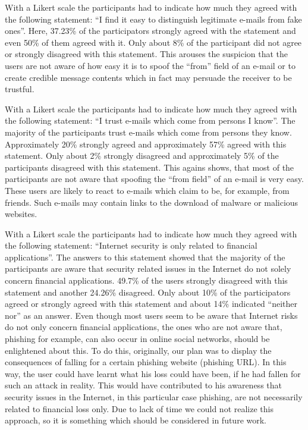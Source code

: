 \begin{description}[leftmargin=0cm]
	\item[Self-Assessment - Distinguish legitimate from illegitimate e-mails] With a Likert scale the participants had to indicate how much they agreed with the following statement: ``I find it easy to distinguish legitimate e-mails from fake ones''. Here, 37.23\% of the participators strongly agreed with the statement and even 50\% of them agreed with it. Only about 8\% of the participant did not agree or strongly disagreed with this statement. This arouses the suspicion that the users are not aware of how easy it is to spoof the ``from'' field of an e-mail or to create credible message contents which in fact may persuade the receiver to be trustful.
	
	\item[Self-Assessment - Trust to e-mails from known parties]  With a Likert scale the participants had to indicate how much they agreed with the following statement: ``I trust e-mails which come from persons I know''. The majority of the participants trust e-mails which come from persons they know. Approximately 20\% strongly agreed and approximately 57\% agreed with this statement. Only about 2\% strongly disagreed and approximately 5\% of the participants disagreed with this statement. This agains shows, that most of the participants are not aware that spoofing the ``from field'' of an e-mail is very easy. These users are likely to react to e-mails which claim to be, for example, from friends. Such e-mails may contain links to the download of malware or malicious websites.

	\item[Self-Assessment - Internet security is only related to financial applications] With a Likert scale the participants had to indicate how much they agreed with the following statement: ``Internet security is only related to financial applications''. The answers to this statement showed that the majority of the participants are aware that security related issues in the Internet do not solely concern financial applications. 49.7\% of the users strongly disagreed with this statement and another 24.26\% disagreed. Only about 10\% of the participators agreed or strongly agreed with this statement and about 14\% indicated ``neither nor'' as an answer. Even though most users seem to be aware that Internet risks do not only concern financial applications, the ones who are not aware that, phishing for example, can also occur in online social networks, should be enlightened about this. To do this, originally, our plan was to display the consequences of falling for a certain phishing website (phishing URL). In this way, the user could have learnt what his loss could have been, if he had fallen for such an attack in reality. This would have contributed to his awareness that security issues in the Internet, in this particular case phishing, are not necessarily related to financial loss only. Due to lack of time we could not realize this approach, so it is something which should be considered in future work.


\end{description}
